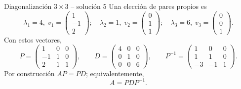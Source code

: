 \documentclass[aspectratio=169,10pt]{beamer}
\begin{document}
\begin{frame}{Diagonalización $3\times 3$ -- solución 5}
\scriptsize
Una elección de pares propios es
\[
\lambda_1=4,\;v_1=\begin{pmatrix}1\\-1\\2\end{pmatrix};\quad \lambda_2=1,\;v_2=\begin{pmatrix}0\\1\\1\end{pmatrix};\quad \lambda_3=6,\;v_3=\begin{pmatrix}0\\0\\1\end{pmatrix}.
\]
Con estos vectores,
\[
P=\begin{pmatrix}1 & 0 & 0\\-1 & 1 & 0\\2 & 1 & 1\end{pmatrix},\qquad D=\begin{pmatrix}4 & 0 & 0\\0 & 1 & 0\\0 & 0 & 6\end{pmatrix},\qquad P^{-1}=\begin{pmatrix}1 & 0 & 0\\1 & 1 & 0\\-3 & -1 & 1\end{pmatrix}.
\]
Por construcción $AP=PD$; equivalentemente,
\[
\boxed{A=PDP^{-1}}.
\]
\end{frame}
\end{document}
